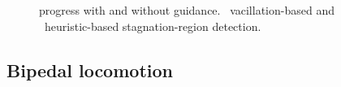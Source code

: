 \documentclass{article}
\begin{document}
\begin{figure}[t]%
  \centering%
%
	\vspace{-3mm}
%
  \caption{%
    \mhastar progress with and without guidance.
    ~vacillation-based 
    and
    ~heuristic-based
    stagnation-region detection.
		}

  \label{fig:detection_plot}%

  \vspace{-4.5mm}

\end{figure}

\subsection{Bipedal locomotion}
\label{subsec:locomotion}
\end{document}
